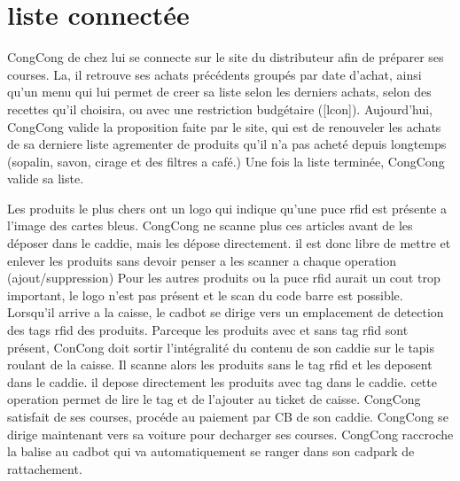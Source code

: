 \section{liste connectée}

CongCong de chez lui se connecte sur le site du distributeur afin de préparer ses courses.
La, il retrouve ses achats précédents groupés par date d'achat, ainsi qu'un menu qui lui permet de creer sa liste selon les derniers achats, selon des recettes qu'il choisira, ou avec une restriction budgétaire ([lcon]). 
Aujourd'hui, CongCong valide la proposition faite par le site, qui est de renouveler les achats de sa derniere liste agrementer de produits qu'il n'a pas acheté depuis longtemps (sopalin, savon, cirage et des filtres a café.)
Une fois la liste terminée, CongCong valide sa liste.

Les produits le plus chers ont un logo qui indique qu'une puce rfid est présente a l'image des cartes bleus. 
CongCong ne scanne plus ces articles avant de les déposer dans le caddie, mais les dépose directement.
il est donc libre de mettre et enlever les produits sans devoir penser a les scanner a chaque operation (ajout/suppression)
Pour les autres produits ou la puce rfid aurait un cout trop important, le logo n'est pas présent et le scan du code barre est possible.
Lorsqu'il arrive a la caisse, le cadbot se dirige vers un emplacement de detection des tags rfid des produits.
Parceque les produits avec et sans tag rfid sont présent, ConCong doit sortir l'intégralité du contenu de son caddie sur le tapis roulant de la caisse.
Il scanne alors les produits sans le tag rfid et les deposent dans le caddie. il depose directement les produits avec tag dans le caddie. cette operation permet de lire le tag et de l'ajouter au ticket de caisse.
CongCong satisfait de ses courses, procéde au paiement par CB de son caddie.
CongCong se dirige maintenant vers sa voiture pour decharger ses courses.
CongCong raccroche la balise au cadbot qui va automatiquement se ranger dans son cadpark de rattachement.


